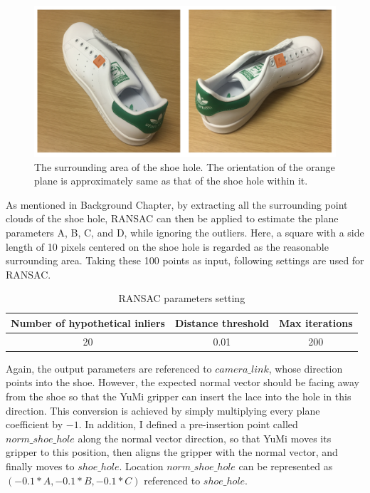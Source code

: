 \begin{figure}[H]
\centering
\includegraphics[width = 0.9\columnwidth]{Implementation/cv/plane.png}
\caption{The surrounding area of the shoe hole. The orientation of the orange plane is approximately same as that of the shoe hole within it.}
\label{plane}
\end{figure}

As mentioned in Background Chapter, by extracting all the surrounding point clouds of the shoe hole, RANSAC can then be applied to estimate the plane parameters A, B, C, and D, while ignoring the outliers. Here, a square with a side length of 10 pixels centered on the shoe hole is regarded as the reasonable surrounding area. Taking these 100 points as input, following settings are used for RANSAC.

\begin{table}[H]
\centering
\begin{tabular}{||c|c|c||}
\hline
Number of hypothetical inliers & Distance threshold & Max iterations \\ \hline\hline
20 & 0.01 & 200 \\ \hline
\end{tabular}
\caption{RANSAC parameters setting}
\label{ransacsetting}
\end{table}

Again, the output parameters are referenced to $camera\_link$, whose direction points into the shoe. However, the expected normal vector should be facing away from the shoe so that the YuMi gripper can insert the lace into the hole in this direction. This conversion is achieved by simply multiplying every plane coefficient by $-1$. In addition, I defined a pre-insertion point called $norm\_shoe\_hole$ along the normal vector direction, so that YuMi moves its gripper to this position, then aligns the gripper with the normal vector, and finally moves to $shoe\_hole$. Location $norm\_shoe\_hole$ can be represented as $(-0.1*A, -0.1*B, -0.1*C)$ referenced to $shoe\_hole$.

